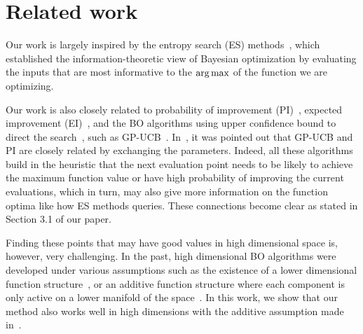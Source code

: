 \section{Related work}
Our work is largely inspired by the entropy search (ES) methods~\cite{hennig2012,hernandez2014predictive}, which established the information-theoretic view of Bayesian optimization by evaluating the inputs that are most informative to the $\operatorname{arg\,max}$ of the function we are optimizing. 

Our work is also closely related to probability of improvement (PI)~\cite{kushner1964}, expected improvement (EI)~\cite{mockus1974}, and  the BO algorithms using upper confidence bound to direct the search~\cite{auer2002b,kawaguchi2015bayesian,kawaguchi2016global}, such as  GP-UCB~\cite{srinivas2009gaussian}. In~\cite{wang2016est}, it was pointed out that GP-UCB and PI are closely related by exchanging the parameters. Indeed, all these algorithms build in the heuristic that the next evaluation point needs to be likely to achieve the maximum function value or have high probability of improving the current evaluations, which in turn, may also give more information on the function optima like how ES methods queries. These connections become clear as stated in Section 3.1 of our paper.

Finding these points that may have good values in high dimensional space is, however, very challenging. In the past, high dimensional BO algorithms were developed under various assumptions such as the existence of a lower dimensional function structure~\cite{djolonga2013high,wang2013}, or an additive function structure where each component is only active on a lower manifold of the space~\cite{li2016high,kandasamy2015high}. In this work, we show that our method also works well in high dimensions with the additive assumption made in~\cite{kandasamy2015high}.

